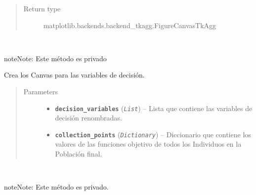 \documentclass[letterpaper,10pt,english]{sphinxmanual}
\begin{document}
\begin{fulllineitems}
\begin{fulllineitems}
\begin{quote}
\begin{description}
\item[{Return type}] \leavevmode
matplotlib.backends.backend\_tkagg.FigureCanvasTkAgg

\end{description}\end{quote}

\end{fulllineitems}


\begin{fulllineitems}
\label{View/Additional/ResultsGrapher/GraphFrame:View.Additional.ResultsGrapher.GraphFrame.GraphFrame._GraphFrame__create_decision_variables_canvas}~
\begin{notice}{note}{Note:}
Este método es privado
\end{notice}

Crea los Canvas para las variables de decisión.
\begin{quote}\begin{description}
\item[{Parameters}] \leavevmode\begin{itemize}
\item {} 
\textbf{\texttt{decision\_variables}} (\emph{\texttt{List}}) -- Lista que contiene las variables de decisión renombradas.

\item {} 
\textbf{\texttt{collection\_points}} (\emph{\texttt{Dictionary}}) -- Diccionario que contiene los valores de las funciones objetivo
de todos los Individuos en la Población final.

\end{itemize}

\end{description}\end{quote}

\end{fulllineitems}


\begin{fulllineitems}
\label{View/Additional/ResultsGrapher/GraphFrame:View.Additional.ResultsGrapher.GraphFrame.GraphFrame._GraphFrame__create_objective_functions_canvas}~
\begin{notice}{note}{Note:}
Este método es privado.
\end{notice}


\end{fulllineitems}
\end{fulllineitems}
\end{document}
